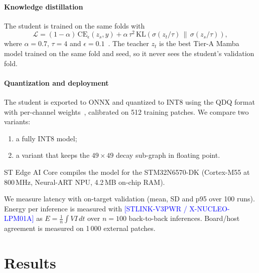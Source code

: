 \documentclass[preprint,12pt]{elsarticle}
\newcommand{\todo}[1]{\textcolor{blue}{[#1]}}
\begin{document}
\paragraph{Knowledge distillation}
The student is trained on the same folds with
\begin{equation}
\mathcal{L}=(1-\alpha)\,\mathrm{CE}_{\epsilon}(z_s,y)+\alpha\,\tau^{2}\,\mathrm{KL}\!\left(\sigma(z_t/\tau)\,\|\,\sigma(z_s/\tau)\right),
\end{equation}
where $\alpha=0.7$, $\tau=4$ and $\epsilon=0.1$~\cite{hinton2015kd}. The teacher $z_t$ is the best Tier-A Mamba model trained on the same fold and seed, so it never sees the student's validation fold.

\paragraph{Quantization and deployment}
The student is exported to ONNX and quantized to INT8 using the QDQ format with per-channel weights~\cite{jacob2018quantization}, calibrated on 512 training patches. We compare two variants:
\begin{enumerate}
\item a fully INT8 model;
\item a variant that keeps the $49\times49$ decay sub-graph in floating point.
\end{enumerate}
ST Edge AI Core compiles the model for the STM32N6570-DK (Cortex-M55 at 800\,MHz, Neural-ART NPU, 4.2\,MB on-chip RAM).

We measure latency with on-target validation (mean, SD and p95 over 100 runs). Energy per inference is measured with \todo{STLINK-V3PWR / X-NUCLEO-LPM01A} as $E=\frac{1}{n}\int V I\,dt$ over $n=100$ back-to-back inferences. Board/host agreement is measured on 1\,000 external patches.

\section{Results}
\end{document}
